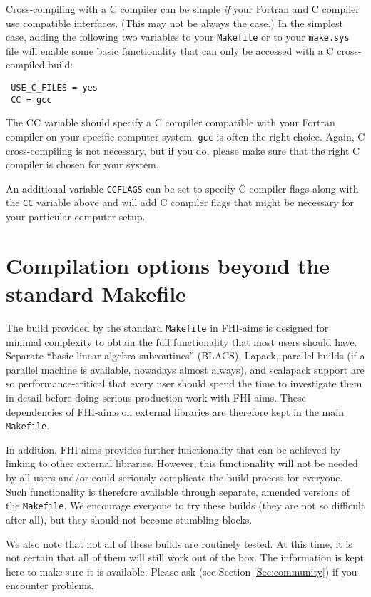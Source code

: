 Cross-compiling with a C compiler can be simple \emph{if} your Fortran
and C compiler use compatible interfaces. (This may not be always the
case.) In the simplest case, adding the following two variables to
your \texttt{Makefile} or to your \texttt{make.sys} file will enable
some basic functionality that can only be accessed with a C
cross-compiled build:

\begin{verbatim}
 USE_C_FILES = yes
 CC = gcc
\end{verbatim}

The CC variable should specify a C compiler compatible with your
Fortran compiler on your specific computer system. \texttt{gcc} is
often the right choice. Again, C cross-compiling is not
necessary, but if you do, please make sure that the right C compiler
is chosen for your system.

An additional variable \texttt{CCFLAGS} can be set to specify C
compiler flags along with the \texttt{CC} variable above and will add
C compiler flags that might be necessary for your particular computer setup.

\section{Compilation options beyond the standard Makefile}
\label{Sec:Makefiles}

The build provided by the standard \texttt{Makefile} in FHI-aims is designed
for minimal complexity to obtain the full functionality that most users should
have. Separate ``basic linear algebra subroutines'' (BLACS), Lapack,
parallel builds (if a parallel machine is available, nowadays almost always),
and scalapack support are so performance-critical that every user should spend
the time to investigate them in detail before doing serious production work
with FHI-aims. These dependencies of FHI-aims on external libraries are
therefore kept in the main \texttt{Makefile}.

In addition, FHI-aims provides further functionality that can be achieved by
linking to other external libraries. However, this functionality will not be
needed by all users and/or could seriously complicate the build process for
everyone. Such functionality is therefore available through separate, amended
versions of the \texttt{Makefile}. We encourage everyone to try these builds
(they are not so difficult after all), but they should not become stumbling
blocks. 

We also note that not all of these builds are routinely tested. At this
time, it is not certain that all of them will still work out of the
box. The information is kept here to make sure it is available. Please
ask (see Section \ref{Sec:community}) if you encounter problems.

